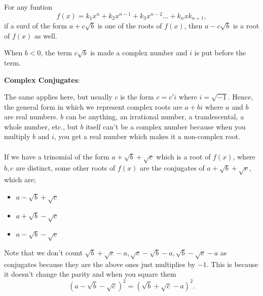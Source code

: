 \begin{mathbox}{}
{For any funtion $$f(x) = k_1x^n + k_2x^{n-1} + k_3x^{n-2} \dots + k_nx k_{n+1},$$ if a surd of the form $a + c\sqrt{b}$ is one of the roots of $f(x)$, then $a - c\sqrt{b}$ is a root of $f(x)$ as well.

When $b<0$, the term $c\sqrt{b}$ is made a complex number and $i$ is put before the term.

\textbf{Complex Conjugates}:

The same applies here, but usually $c$ is the form $c = c'i$ where $i = \sqrt{-1}$. Hence, the general form in which we represent complex roots are $a + bi$ where $a$ and $b$ are real numbers. $b$ can be anything, an irrational number, a trandescental, a whole number, etc., but $b$ itself can't be a complex number because when you multiply $b$ and $i$, you get a real number which makes it a non-complex root.
\\\\
If we have a trinomial of the form $a + \sqrt{b} + \sqrt{c}$ which is a root of $f(x)$, where $b,c$ are distinct, some other roots of $f(x)$ are the conjugates of $a + \sqrt{b} + \sqrt{c}$, which are;
\begin{itemize}
    \item{$a - \sqrt{b} + \sqrt{c}$}
    \item{$a + \sqrt{b} - \sqrt{c}$}
    \item{$a - \sqrt{b} - \sqrt{c}$}
\end{itemize}
Note that we don't count $\sqrt{b} + \sqrt{c}-a, \sqrt{c} - \sqrt{b} - a, \sqrt{b} - \sqrt{c} - a$ as conjugates because they are the above ones just multiplies by $-1$. This is because it doesn't change the parity and when you square them $$(a - \sqrt{b} - \sqrt{c})^2 = (\sqrt{b} + \sqrt{c}-a)^2.$$}
\end{mathbox}
